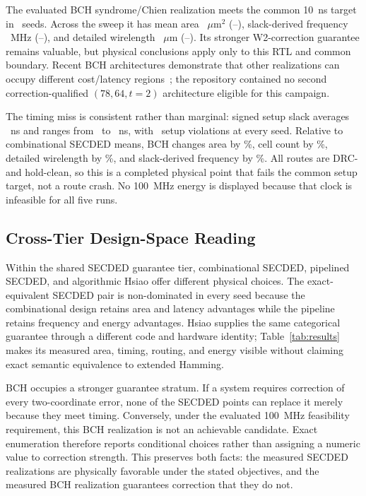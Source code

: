 The evaluated BCH syndrome/Chien realization meets the common 10~ns target in \BchFeasible\ seeds. Across the sweep it has mean area \BchAreaMean~$\mu$m$^2$ (\BchAreaMin--\BchAreaMax), slack-derived frequency \BchFreqMean~MHz (\BchFreqMin--\BchFreqMax), and detailed wirelength \BchWireMean~$\mu$m (\BchWireMin--\BchWireMax). Its stronger W2-correction guarantee remains valuable, but physical conclusions apply only to this RTL and common boundary. Recent BCH architectures demonstrate that other realizations can occupy different cost/latency regions~\cite{lagendijk2026}; the repository contained no second correction-qualified $(78,64,t=2)$ architecture eligible for this campaign.

The timing miss is consistent rather than marginal: signed setup slack averages \BchSlackMean~ns and ranges from \BchSlackMin\ to \BchSlackMax~ns, with \BchSetupViolationsMean\ setup violations at every seed. Relative to combinational SECDED means, BCH changes area by \BchVsCombArea\%, cell count by \BchVsCombCells\%, detailed wirelength by \BchVsCombWire\%, and slack-derived frequency by \BchVsCombFreq\%. All routes are DRC- and hold-clean, so this is a completed physical point that fails the common setup target, not a route crash. No 100~MHz energy is displayed because that clock is infeasible for all five runs.

\subsection{Cross-Tier Design-Space Reading}

Within the shared SECDED guarantee tier, combinational SECDED, pipelined SECDED, and algorithmic Hsiao offer different physical choices. The exact-equivalent SECDED pair is non-dominated in every seed because the combinational design retains area and latency advantages while the pipeline retains frequency and energy advantages. Hsiao supplies the same categorical guarantee through a different code and hardware identity; Table~\ref{tab:results} makes its measured area, timing, routing, and energy visible without claiming exact semantic equivalence to extended Hamming.

BCH occupies a stronger guarantee stratum. If a system requires correction of every two-coordinate error, none of the SECDED points can replace it merely because they meet timing. Conversely, under the evaluated 100~MHz feasibility requirement, this BCH realization is not an achievable candidate. Exact enumeration therefore reports conditional choices rather than assigning a numeric value to correction strength. This preserves both facts: the measured SECDED realizations are physically favorable under the stated objectives, and the measured BCH realization guarantees correction that they do not.
